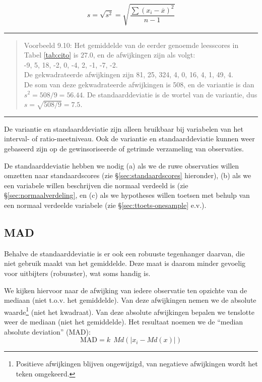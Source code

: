 \documentclass[
]{book}
\begin{document}
\begin{equation}
  s = \sqrt{s^2} = \sqrt{ \frac{ \sum (x_i - \overline{x})^2 } {n-1} }
  \label{eq:standaarddeviatie}
\end{equation}

\begin{center}\rule{0.5\linewidth}{0.5pt}\end{center}

\begin{quote}
Voorbeeld 9.10:
Het gemiddelde van de eerder genoemde leesscores in
Tabel \ref{tab:cito} is
\(27.0\), en de afwijkingen zijn als volgt:\\
-9, 5, 18, -2, 0, -4, 2, -1, -7, -2.\\
De gekwadrateerde afwijkingen zijn 81, 25, 324, 4, 0, 16, 4, 1, 49, 4.\\
De som van deze gekwadrateerde afwijkingen is 508, en de variantie is
dan \(s^2=508/9=56.44\). De standaarddeviatie is de wortel van de
variantie, dus \(s=\sqrt{508/9}=7.5\).
\end{quote}

\begin{center}\rule{0.5\linewidth}{0.5pt}\end{center}

De variantie en standaarddeviatie zijn alleen bruikbaar bij variabelen
van het interval- of ratio-meetniveau. Ook de variantie en
standaarddeviatie kunnen weer gebaseerd zijn op de gewinsoriseerde of
getrimde verzameling van observaties.

De standaarddeviatie hebben we nodig
(a) als we de ruwe observaties
willen omzetten naar standaardscores (zie §\ref{sec:standaardscores} hieronder),
(b) als we een variabele
willen beschrijven die normaal verdeeld is (zie §\ref{sec:normaalverdeling}, en
(c) als we hypotheses willen toetsen met behulp van een normaal verdeelde variabele (zie §\ref{sec:ttoets-onesample} e.v.).

\subsection{MAD}\label{mad}

Behalve de standaarddeviatie is er ook een robuuste tegenhanger daarvan,
die niet gebruik maakt van het gemiddelde. Deze maat is daarom minder
gevoelig voor uitbijters (robuuster), wat soms handig is.

We kijken hiervoor naar de afwijking van iedere observatie ten opzichte
van de mediaan (niet t.o.v. het gemiddelde). Van deze afwijkingen nemen
we de absolute waarde\footnote{Positieve afwijkingen blijven ongewijzigd, van negatieve afwijkingen wordt het teken omgekeerd.} (niet het kwadraat). Van deze absolute
afwijkingen bepalen we tenslotte weer de mediaan (niet het gemiddelde).
Het resultaat noemen we de ``median absolute deviation'' (MAD):
\begin{equation}
  \textrm{MAD} = k ~~ Md ( |x_i - Md(x) |)
  \label{eq:MAD}
\end{equation}
\end{document}
